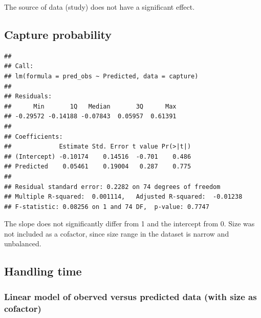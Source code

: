 The source of data (study) does not have a significant effect.

\hypertarget{capture-probability}{%
\subsection{Capture probability}\label{capture-probability}}

\begin{verbatim}
## 
## Call:
## lm(formula = pred_obs ~ Predicted, data = capture)
## 
## Residuals:
##      Min       1Q   Median       3Q      Max 
## -0.29572 -0.14188 -0.07843  0.05957  0.61391 
## 
## Coefficients:
##             Estimate Std. Error t value Pr(>|t|)
## (Intercept) -0.10174    0.14516  -0.701    0.486
## Predicted    0.05461    0.19004   0.287    0.775
## 
## Residual standard error: 0.2282 on 74 degrees of freedom
## Multiple R-squared:  0.001114,   Adjusted R-squared:  -0.01238 
## F-statistic: 0.08256 on 1 and 74 DF,  p-value: 0.7747
\end{verbatim}

The slope does not significantly differ from 1 and the intercept from 0.
Size was not included as a cofactor, since size range in the dataset is
narrow and unbalanced.

\hypertarget{handling-time}{%
\subsection{Handling time}\label{handling-time}}

\hypertarget{linear-model-of-oberved-versus-predicted-data-with-size-as-cofactor-1}{%
\subsubsection{Linear model of oberved versus predicted data (with size
as
cofactor)}\label{linear-model-of-oberved-versus-predicted-data-with-size-as-cofactor-1}}

